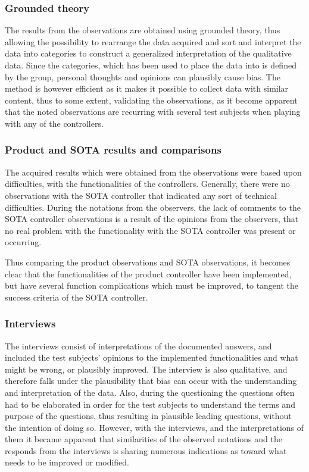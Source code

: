 \subsubsection*{Grounded theory}
The results from the observations are obtained using grounded theory, thus allowing the possibility to rearrange the data acquired and sort and interpret the data into categories to construct a generalized interpretation of the qualitative data.
Since the categories, which has been used to place the data into is defined by the group, personal thoughts and opinions can plausibly cause bias. 
The method is however efficient as it makes it possible to collect data with similar content, thus to some extent, validating the observations, as it become apparent that the noted observations are recurring with several test subjects when playing with any of the controllers.

\subsubsection*{Product and SOTA results and comparisons}
The acquired results which were obtained from the observations were based upon difficulties, with the functionalities of the controllers. 
Generally, there were no observations with the SOTA controller that indicated any sort of technical difficulties. 
During the notations from the observers, the lack of comments to the SOTA controller observations is a result of the opinions from the observers, that no real problem with the functionality with the SOTA controller was present or occurring.

Thus comparing the product observations and SOTA observations, it becomes clear that the functionalities of the product controller have been implemented, but have several function complications which must be improved, to tangent the success criteria of the SOTA controller.

\subsubsection*{Interviews}
The interviews consist of interpretations of the documented answers, and included the test subjects’ opinions to the implemented functionalities and what might be wrong, or plausibly improved. 
The interview is also qualitative, and therefore falls under the plausibility that bias can occur with the understanding and interpretation of the data. 
Also, during the questioning the questions often had to be elaborated in order for the test subjects to understand the terms and purpose of the questions, thus resulting in plausible leading questions, without the intention of doing so.
However, with the interviews, and the interpretations of them it became apparent that similarities of the observed notations and the responds from the interviews is sharing numerous indications as toward what needs to be improved or modified. 